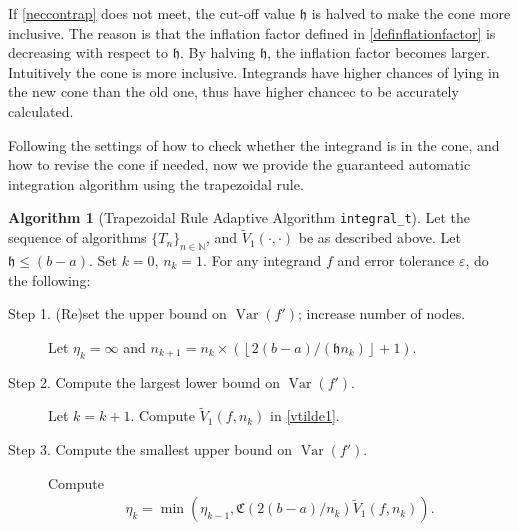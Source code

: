 \documentclass{iitthesis}
\DeclareMathOperator{\Var}{Var}
\theoremstyle{definition}
\newtheorem{algo}{Algorithm}
\theoremstyle{remark}
\begin{document}
If \eqref{neccontrap} does not meet, the cut-off value $\mathfrak{h}$ is halved to make the cone more inclusive. The reason is that the inflation factor defined in \eqref{definflationfactor} is decreasing with respect to $\mathfrak{h}$. By halving $\mathfrak{h}$, the inflation factor becomes larger. Intuitively the cone is more inclusive. Integrands have higher chances of lying in the new cone than the old one, thus have higher chancec to be accurately calculated.

Following the settings of how to check whether the integrand is in the cone, and how to revise the cone if needed, now we provide the guaranteed automatic integration algorithm using the trapezoidal rule.
\begin{algo}[Trapezoidal Rule Adaptive Algorithm {\tt integral\_t}] \label{multistagetrapalgo}
Let the sequence of algorithms $\{T_n\}_{n\in \mathbb{N}}$, %
and $\widetilde{V}_1(\cdot,\cdot)$ be as described above.
Let $\mathfrak{h}\le (b-a)$. Set $k=0$, $n_{k}=1$. For any integrand $f$ and error tolerance $\varepsilon$, do the following: %
\begin{description}
\item[Step 1. (Re)set the upper bound on $\Var(f')$; increase number of nodes.] Let $\eta_{k}=\infty$ and $n_{k+1}=n_k\times\left(\left\lfloor2(b-a)/(\mathfrak{h}n_{k})\right\rfloor+1\right)$.

\item[Step 2. Compute the largest lower bound on {$\Var(f')$}.] Let $k=k+1$. Compute  $\widetilde{V}_1(f,n_k)$ in \eqref{vtilde1}.%

\item[Step 3. Compute the smallest upper bound on {$\Var(f')$}.] Compute
    \begin{align*}
        \eta_{k}=\min\left(\eta_{k-1},\mathfrak{C}(2(b-a)/n_{k})\widetilde{V}_1(f,n_k)\right).
    \end{align*}


\end{description}
\end{algo}
\end{document}

